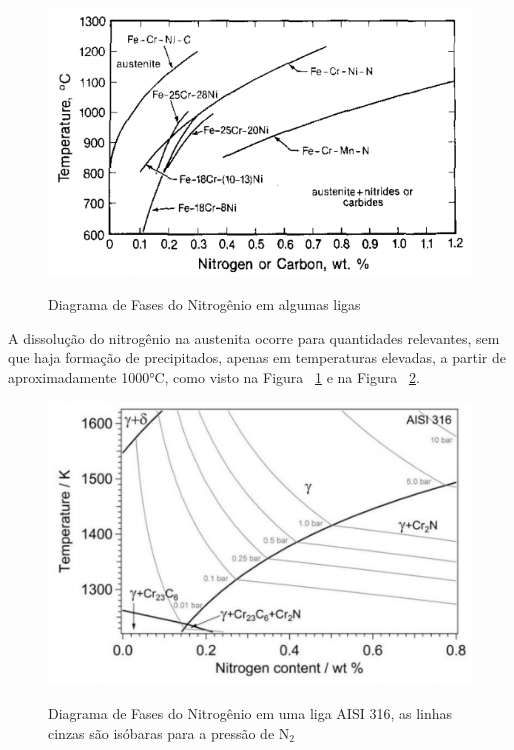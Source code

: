 \documentclass[]{politex}
\begin{document}
	\begin{figure}[ht]
	\caption{Diagrama de Fases do Nitrogênio em algumas ligas}
	\includegraphics{solubN}
	\label{fig:diagrN}
	\centering
	\end{figure}
	
	A dissolução do nitrogênio na austenita ocorre para quantidades relevantes, sem que haja formação de precipitados, apenas em temperaturas elevadas, a partir de aproximadamente 1000°C, como visto na Figura ~\ref{fig:diagrN} e na Figura ~\ref{fig:diagramaN}.\par
	
	\begin{figure}[ht]
	\caption{Diagrama de Fases do Nitrogênio em uma liga AISI 316, as linhas cinzas são isóbaras para a pressão de N$_{2}$}
	\includegraphics{diagramaN}
	\label{fig:diagramaN}
	\centering
	\end{figure}
	
\end{document}
